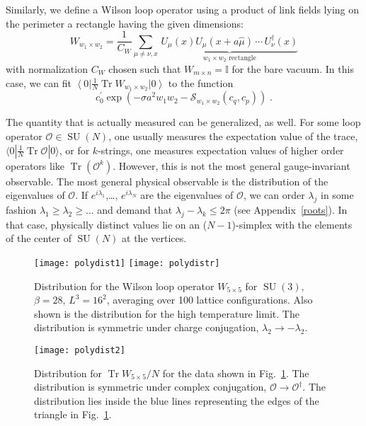 \documentclass[preprint,aps,prd]{revtex4-2}
\newcommand{\be}{\begin{equation}}
\newcommand{\eq}{\end{equation}}
\DeclareMathOperator{\SU}{SU}
\DeclareMathOperator{\Tr}{Tr}
\begin{document}
Similarly, we define a Wilson loop operator using a product of
link fields lying on the perimeter a rectangle having the given
dimensions:
\be
       W_{w_1\times w_2} = \frac{1}{C_W} \sum_{\mu \ne \nu, x}\,
         \underbrace{U_\mu(x) U_\mu(x+a \hat{\mu}) \,\cdots\, U_\nu^\dagger (x)
         }_{\mbox{$w_1\times w_2$ rectangle}}
\eq
with normalization $C_W$ chosen such that $W_{m\times n} = \mathbb{I}$
for the bare vacuum.  In this case, we can fit $\left\langle 0 \right|
\frac{1}{N} \Tr W_{w_1\times w_2} \left|0\right\rangle $ to the function
\be
     c_0^\prime \exp\left(
     -\sigma a^2 w_1 w_2 - \mathcal{S}_{w_1\times w_2}\left(c_q, c_p\right)
     \right)  \; .  \label{wfit}
\eq

The quantity that is actually measured can be generalized, as well.
For some loop operator $\mathcal{O}\in\SU(N)$, one usually
measures the expectation value of the trace,
$\langle 0 | \frac{1}{N} \Tr \mathcal{O} |0\rangle$, or for $k$-strings,
one measures expectation values of higher order operators
like $\Tr\left( \mathcal{O}^k\right)$.
However, this is not the most general gauge-invariant observable.
The most general physical observable is the distribution of the
eigenvalues of $\mathcal{O}$.  If $e^{i\lambda_1}$,\ldots, $e^{i\lambda_N}$
are the eigenvalues of $\mathcal{O}$, we can order $\lambda_j$ in
some fashion $\lambda_1\ge \lambda_2 \ge \ldots$ and demand that
$\lambda_j-\lambda_k\le 2\pi$ (see Appendix~\ref{roots}).
In that case, physically
distinct values lie on an ($N-1$)-simplex with the elements of the
center of $\SU(N)$ at the vertices.

\begin{figure}
  \texttt{[image: polydist1]}
  \texttt{[image: polydistr]}
  \caption{Distribution for the Wilson loop operator
    $W_{5\times 5}$ for $\SU(3)$, $\beta=28$, $L^3=16^2$,
    averaging over 100 lattice configurations.
    Also shown is the distribution for the high temperature
    limit.  The distribution is
    symmetric under charge conjugation,
    $\lambda_2 \to -\lambda_2$.
   \label{polydist1}}
\end{figure}
\begin{figure}
  \texttt{[image: polydist2]}
  \caption{Distribution for $\Tr W_{5\times 5}/N$  for
    the data shown in Fig.~\ref{polydist1}.  
    The distribution is symmetric under complex conjugation,
    $\mathcal{O}\to\mathcal{O}^\dagger$.
    The distribution lies inside the blue lines representing
    the edges of the triangle in Fig.~\ref{polydist1}.
    \label{polydist2}}
\end{figure}
\end{document}
